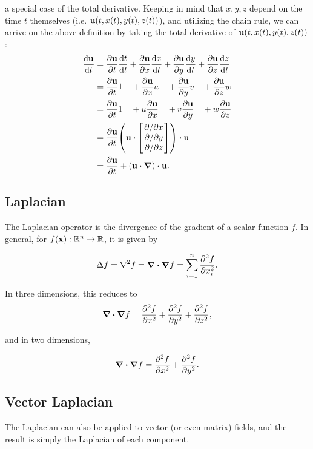 a special case of the total derivative. Keeping in mind that $x, y, z$ depend on
the time $t$ themselves (i.e. $\vb{u}(t, x(t), y(t), z(t))$), and utilizing the
chain rule, we can arrive on the above definition by taking the total derivative
of $\vb{u}(t, x(t), y(t), z(t))$:
\begin{alignat*}{2}
    \dv{\vb{u}}{t} &= \pdv{\vb{u}}{t}\dv{t}{t} 
                    + \pdv{\vb{u}}{x}\dv{x}{t} 
                    + \pdv{\vb{u}}{y}\dv{y}{t} 
                    + \pdv{\vb{u}}{z}\dv{z}{t} \\
                    &= \pdv{\vb{u}}{t} 1 \quad
                    + \pdv{\vb{u}}{x} u \quad
                    + \pdv{\vb{u}}{y} v \quad
                    + \pdv{\vb{u}}{z} w \\
                    &= \pdv{\vb{u}}{t} 1 \quad
                    + u \pdv{\vb{u}}{x} \quad
                    + v \pdv{\vb{u}}{y} \quad
                    + w \pdv{\vb{u}}{z} \\
                    &= \pdv{\vb{u}}{t}
                    \qty(
                        \vb{u}
                        \vdot
                        \mqty[ \pdv*{x} \\ \pdv*{y} \\ \pdv*{z} ]
                    ) \vdot \vb{u} \\
                    &= \pdv{\vb{u}}{t}
                    + \qty(\vb{u}\vdot\grad)\vdot\vb{u}.
\end{alignat*}

\subsection*{Laplacian}
The Laplacian operator is the divergence of the gradient of a scalar function
$f$. In general, for $f(\vb{x}): \mathbb{R}^n \to \mathbb{R}$, it is given by

$$\Delta f = \laplacian{f} = \grad \vdot \grad f = \sum_{i=1}^n
\pdv[2]{f}{x_i}.$$

In three dimensions, this reduces to 
$$\grad \vdot \grad f = \pdv[2]{f}{x} + \pdv[2]{f}{y} + \pdv[2]{f}{z},$$

and in two dimensions,

$$ \grad \vdot \grad f = \pdv[2]{f}{x} + \pdv[2]{f}{y}.$$

\subsection*{Vector Laplacian}
\label{section:vector-laplacian}
The Laplacian can also be applied to vector (or even matrix) fields, and the
result is simply the Laplacian of each component.

